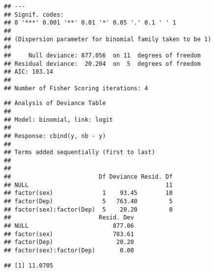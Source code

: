 \begin{solution}{6.5}
\begin{enumerate}
\begin{knitrout}
\begin{kframe}
\begin{verbatim}
## ---
## Signif. codes:
## 0 '***' 0.001 '**' 0.01 '*' 0.05 '.' 0.1 ' ' 1
##
## (Dispersion parameter for binomial family taken to be 1)
##
##     Null deviance: 877.056  on 11  degrees of freedom
## Residual deviance:  20.204  on  5  degrees of freedom
## AIC: 103.14
##
## Number of Fisher Scoring iterations: 4
\end{verbatim}
\begin{alltt}
 \hlkwb{<-} \hlstd{(}\hlopt{-}\hlopt{~}\hlopt{*}
\end{alltt}
\begin{verbatim}
## Analysis of Deviance Table
##
## Model: binomial, link: logit
##
## Response: cbind(y, nb - y)
##
## Terms added sequentially (first to last)
##
##
##                         Df Deviance Resid. Df
## NULL                                       11
## factor(sex)              1    93.45        10
## factor(Dep)              5   763.40         5
## factor(sex):factor(Dep)  5    20.20         0
##                         Resid. Dev
## NULL                        877.06
## factor(sex)                 783.61
## factor(Dep)                  20.20
## factor(sex):factor(Dep)       0.00
\end{verbatim}
\begin{alltt}
\hlstd{(}\hlstd{,}\hlstd{)}
\end{alltt}
\begin{verbatim}
## [1] 11.0705
\end{verbatim}
\end{kframe}
\end{knitrout}
\end{enumerate}
\end{solution}
